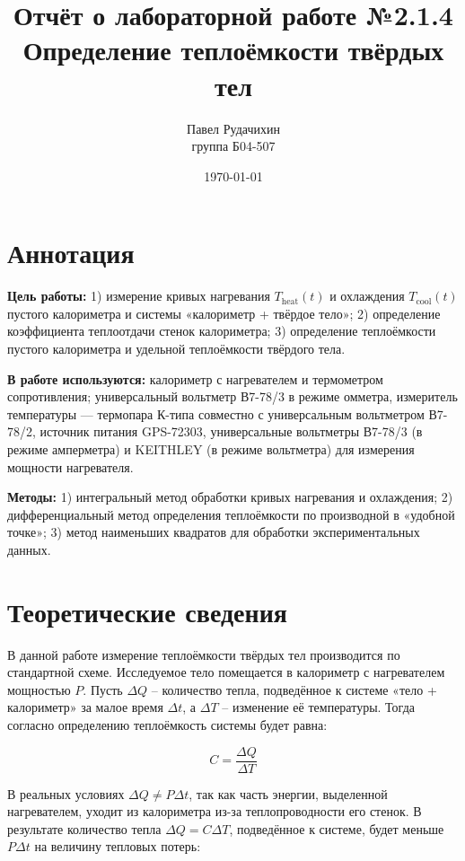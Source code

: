 \documentclass{article}
\title{Отчёт о лабораторной работе №2.1.4 \\ Определение теплоёмкости твёрдых тел}
\author{Павел Рудачихин \\ группа Б04-507}
\date{\today}
\begin{document}
	\maketitle
	
	\section*{Аннотация}
	
	\hspace{4mm}\textbf{Цель работы:} 1) измерение кривых нагревания $T_{\text{heat}}(t)$ и охлаждения $T_{\text{cool}}(t)$ пустого калориметра и системы «калориметр + твёрдое тело»; 2) определение коэффициента теплоотдачи стенок калориметра; 3) определение теплоёмкости пустого калориметра и удельной теплоёмкости твёрдого тела.
	
	\textbf{В работе используются:} калориметр с нагревателем и термометром сопротивления; универсальный вольтметр В7-78/3 в режиме омметра, измеритель температуры — термопара К-типа совместно с универсальным вольтметром В7-78/2, источник питания GPS-72303, универсальные вольтметры В7-78/3 (в режиме амперметра) и KEITHLEY (в режиме вольтметра) для измерения мощности нагревателя.
	
	\textbf{Методы:} 1) интегральный метод обработки кривых нагревания и охлаждения; 2) дифференциальный метод определения теплоёмкости по производной в «удобной точке»; 3) метод наименьших квадратов для обработки экспериментальных данных.
	
	\section*{Теоретические сведения}

	
	\hspace{4mm} В данной работе измерение теплоёмкости твёрдых тел производится по стандартной схеме. Исследуемое тело помещается в калориметр с нагревателем мощностью $P$. Пусть $\Delta Q$ – количество тепла, подведённое к системе «тело + калориметр» за малое время $\Delta t$, а $\Delta T$ – изменение её температуры. Тогда согласно определению теплоёмкость системы будет равна:
	
	\begin{equation}
		C = \frac{\Delta Q}{\Delta T} \tag{1}
	\end{equation}
	
	В реальных условиях $\Delta Q \neq P\Delta t$, так как часть энергии, выделенной нагревателем, уходит из калориметра из-за теплопроводности его стенок. В результате количество тепла $\Delta Q = C\Delta T$, подведённое к системе, будет меньше $P\Delta t$ на величину тепловых потерь:
	
\end{document}
